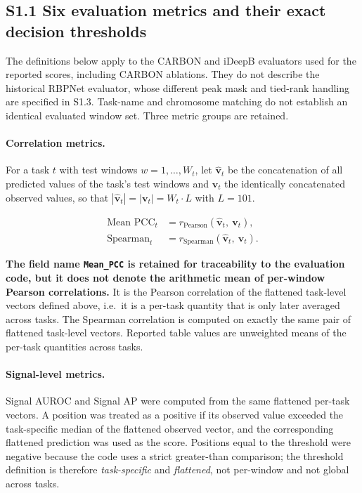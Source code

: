 \documentclass[11pt]{article}
\begin{document}
\subsection*{S1.1 Six evaluation metrics and their exact decision thresholds}

The definitions below apply to the CARBON and iDeepB evaluators used for the reported scores, including CARBON ablations. They do not describe the historical RBPNet evaluator, whose different peak mask and tied-rank handling are specified in S1.3. Task-name and chromosome matching do not establish an identical evaluated window set. Three metric groups are retained.

\paragraph{Correlation metrics.} For a task $t$ with test windows $w = 1,\dots,W_t$, let $\hat{\mathbf{v}}_t$ be the concatenation of all predicted values of the task's test windows and $\mathbf{v}_t$ the identically concatenated observed values, so that $|\hat{\mathbf{v}}_t| = |\mathbf{v}_t| = W_t \cdot L$ with $L = 101$.

\begin{align}
\text{Mean PCC}_t &= r_{\mathrm{Pearson}}\!\left(\hat{\mathbf{v}}_t,\ \mathbf{v}_t\right),\\
\text{Spearman}_t &= r_{\mathrm{Spearman}}\!\left(\hat{\mathbf{v}}_t,\ \mathbf{v}_t\right).
\end{align}

\textbf{The field name \texttt{Mean\_PCC} is retained for traceability to the evaluation code, but it does not denote the arithmetic mean of per-window Pearson correlations.} It is the Pearson correlation of the flattened task-level vectors defined above, i.e.\ it is a per-task quantity that is only later averaged across tasks. The Spearman correlation is computed on exactly the same pair of flattened task-level vectors. Reported table values are unweighted means of the per-task quantities across tasks.

\paragraph{Signal-level metrics.} Signal AUROC and Signal AP were computed from the same flattened per-task vectors. A position was treated as a positive if its observed value exceeded the task-specific median of the flattened observed vector, and the corresponding flattened prediction was used as the score. Positions equal to the threshold were negative because the code uses a strict greater-than comparison; the threshold definition is therefore \emph{task-specific} and \emph{flattened}, not per-window and not global across tasks.
\end{document}
